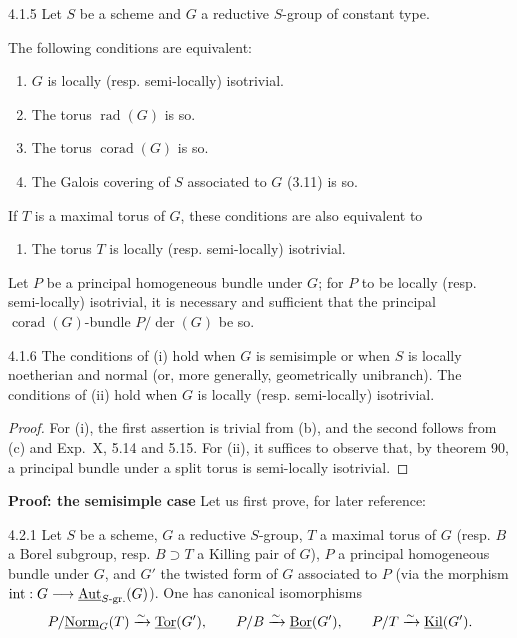 \begin{theorem}{4.1.5}\label{XXIV.4.1.5}
Let $S$ be a scheme and $G$ a reductive $S$-group of constant type.
\begin{enumeratei}
\item The following conditions are equivalent:
\begin{enumerate}[label=\textup{(\alph*)}]
\item $G$ is locally (resp. semi-locally) isotrivial.
\item The torus $\operatorname{rad}(G)$ is so.
\item[(b')] The torus $\operatorname{corad}(G)$ is so.
\item The Galois covering of $S$ associated to $G$ (3.11) is so.
\end{enumerate}
If $T$ is a maximal torus of $G$, these conditions are also equivalent to
\begin{enumerate}[label=\textup{(\alph*)},start=4]
\item The torus $T$ is locally (resp. semi-locally) isotrivial.
\end{enumerate}
\item Let $P$ be a principal homogeneous bundle under $G$; for $P$ to be locally (resp. semi-locally) isotrivial, it is necessary and sufficient that the principal $\operatorname{corad}(G)$-bundle $P/\operatorname{der}(G)$ be so.
\end{enumeratei}
\end{theorem}
\begin{corollary}{4.1.6}\label{XXIV.4.1.6}
The conditions of (i) hold when $G$ is semisimple or when $S$ is locally noetherian and normal (or, more generally, geometrically unibranch). The conditions of (ii) hold when $G$ is locally (resp. semi-locally) isotrivial.
\end{corollary}
\begin{proof}
For (i), the first assertion is trivial from (b), and the second follows from (c) and Exp.~X, 5.14 and 5.15. For (ii), it suffices to observe that, by theorem 90, a principal bundle under a split torus is semi-locally isotrivial.
\end{proof}
\label{XXIV.4.2}\textbf{Proof: the semisimple case}
Let us first prove, for later reference:
\begin{proposition}{4.2.1}\label{XXIV.4.2.1}
Let $S$ be a scheme, $G$ a reductive $S$-group, $T$ a maximal torus of $G$ (resp. $B$ a Borel subgroup, resp. $B\supset T$ a Killing pair of $G$), $P$ a principal homogeneous bundle under $G$, and $G'$ the twisted form of $G$ associated to $P$ (via the morphism $\mathrm{int}:G\longrightarrow\underline{\operatorname{Aut}}_{S\text{-gr.}}(G)$). One has canonical isomorphisms
\[
P/\underline{\mathrm{Norm}}_G(T)\xrightarrow{\sim}\underline{\operatorname{Tor}}(G'),\qquad
P/B\xrightarrow{\sim}\underline{\operatorname{Bor}}(G'),\qquad
P/T\xrightarrow{\sim}\underline{\operatorname{Kil}}(G').
\]
\end{proposition}
